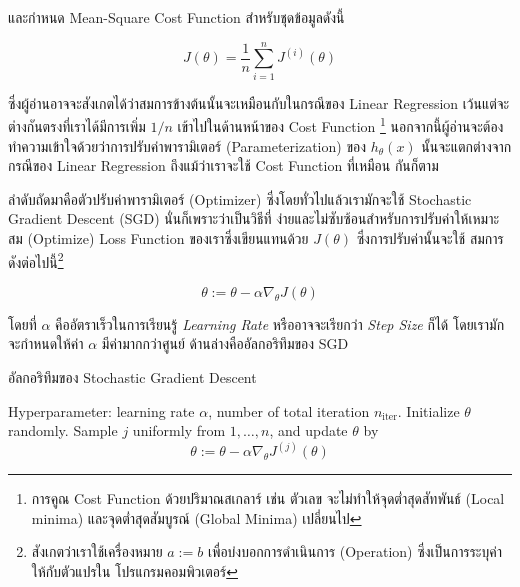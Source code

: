 \noindent และกำหนด Mean-Square Cost Function สำหรับชุดข้อมูลดังนี้

\begin{equation}\label{eq:mse_loss}
    J(\theta) = \frac 1 n \sum_{i=1}^n J^{(i)}(\theta)
\end{equation}

\noindent ซึ่งผู้อ่านอาจจะสังเกตได้ว่าสมการข้างต้นนั้นจะเหมือนกับในกรณีของ Linear Regression เว้นแต่จะต่างกันตรงที่เราได้มีการเพิ่ม $1/n$
เข้าไปในด้านหน้าของ Cost Function \footnote{การคูณ Cost Function ด้วยปริมาณสเกลาร์ เช่น ตัวเลข จะไม่ทำให้จุดต่ำสุดสัทพันธ์ 
(Local minima) และจุดต่ำสุดสัมบูรณ์ (Global Minima) เปลี่ยนไป} นอกจากนี้ผู้อ่านจะต้องทำความเข้าใจด้วยว่าการปรับค่าพารามิเตอร์ 
(Parameterization) ของ $h_\theta(x)$ นั้นจะแตกต่างจากกรณีของ Linear Regression ถึงแม้ว่าเราจะใช้ Cost Function ที่เหมือน%
กันก็ตาม 

ลำดับถัดมาคือตัวปรับค่าพารามิเตอร์ (Optimizer) ซึ่งโดยทั่วไปแล้วเรามักจะใช้ Stochastic Gradient Descent (SGD) นั่นก็เพราะว่าเป็นวิธีที่%
ง่ายและไม่ซับซ้อนสำหรับการปรับค่าให้เหมาะสม (Optimize) Loss Function ของเราซึ่งเขียนแทนด้วย $J(\theta)$ ซึ่งการปรับค่านั้นจะใช้%
สมการดังต่อไปนี้\footnote{สังเกตว่าเราใช้เครื่องหมาย $a := b$ เพื่อบ่งบอกการดำเนินการ (Operation) ซึ่งเป็นการระบุค่าให้กับตัวแปรใน%
โปรแกรมคอมพิวเตอร์}

\begin{equation}
    \theta := \theta - \alpha\nabla_\theta J(\theta)
\end{equation}

\noindent โดยที่ $\alpha$ คืออัตราเร็วในการเรียนรู้ \textit{Learning Rate} หรืออาจจะเรียกว่า \textit{Step Size} ก็ได้ 
โดยเรามักจะกำหนดให้ค่า $\alpha$ มีค่ามากกว่าศูนย์ ด้านล่างคืออัลกอริทึมของ SGD

\begin{algorithm}[ht]
    \caption{อัลกอริทึมของ Stochastic Gradient Descent}
    \label{alg:sgd_dl}
    \begin{algorithmic}
    \State Hyperparameter: learning rate $\alpha$, number of total iteration $n_\text{iter}$.
    \State Initialize $\theta$ randomly.
        \State Sample $j$ uniformly from ${1,\ldots,n}$, and update $\theta$ by
        \begin{equation*}
            \theta := \theta - \alpha\nabla_\theta J^{(j)}(\theta)
        \end{equation*}
    \EndFor
    \end{algorithmic}
\end{algorithm}

